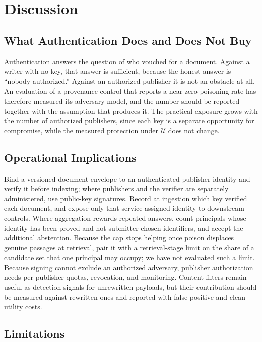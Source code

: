 \documentclass[lettersize,journal]{IEEEtran}
\newcommand{\AdvU}{\mathcal{U}}
\begin{document}
\section{Discussion}
\label{sec:discussion}

\subsection{What Authentication Does and Does Not Buy}

Authentication answers the question of who vouched for a document. Against a writer with no
key, that answer is sufficient, because the honest answer is ``nobody authorized.'' Against an
authorized publisher it is not an obstacle at all. An evaluation of a provenance control that
reports a near-zero poisoning rate has therefore measured its adversary model, and the number
should be reported together with the assumption that produces it. The practical exposure grows
with the number of authorized publishers, since each key is a separate opportunity for
compromise, while the measured protection under $\AdvU$ does not change.

\subsection{Operational Implications}

Bind a versioned document envelope to an authenticated publisher identity and verify it before
indexing; where publishers and the verifier are separately administered, use public-key
signatures. Record at ingestion which key verified each document, and expose only that
service-assigned identity to downstream controls. Where aggregation rewards repeated answers,
count principals whose identity has been proved and not submitter-chosen identifiers, and
accept the additional abstention. Because the cap stops helping once poison displaces genuine
passages at retrieval, pair it with a retrieval-stage limit on the share of a candidate set
that one principal may occupy; we have not evaluated such a limit. Because signing cannot
exclude an authorized adversary, publisher authorization needs per-publisher quotas,
revocation, and monitoring. Content filters remain useful as detection signals for unrewritten
payloads, but their contribution should be measured against rewritten ones and reported with
false-positive and clean-utility costs.

\subsection{Limitations}
\label{sec:limitations}
\end{document}
